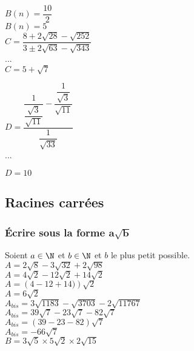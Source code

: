 $ B(n) = \dfrac{10}{2} $ \\

$ B(n) = 5 $ \\

$ C = \dfrac{8 + 2\sqrt{28} - \sqrt{252}}{3 ± 2\sqrt{63} - \sqrt{343}} $ \\

... \\

$ C = 5 + \sqrt{7} $

$ D = \dfrac{\dfrac{1}{\dfrac{\sqrt{3}}{\sqrt{11}}}-\dfrac{\dfrac{1}{\sqrt{3}}}{\sqrt{11}}}{\dfrac{1}{\sqrt{33}}} $ \\

...

$ D = 10 $

\newpage

\subsection{Racines carrées}

\subsubsection{Écrire sous la forme $ \mathbf{a\sqrt{b}} $}

Soient $ a \in \N $ et $ b \in \N $ et $ b $ le plus petit possible. \\

$ A = 2\sqrt{8} - 3\sqrt{32} + 2\sqrt{98} $ \\

$ A = 4\sqrt{2} - 12 \sqrt{2} + 14\sqrt{2} $ \\

$ A = \left(4-12+14)\right)\sqrt{2} $ \\

$ A = 6\sqrt{2} $ \\

$ A_{bis} = 3\sqrt{1183} - \sqrt{3703} - 2\sqrt{11767} $ \\

$ A_{bis} = 39\sqrt{7} - 23\sqrt{7} - 82\sqrt{7} $ \\

$ A_{bis} = \left(39-23-82\right)\sqrt{7} $ \\

$ A_{bis} = -66\sqrt{7} $ \\

$ B = 3\sqrt{5} \times 5\sqrt{2} \times 2\sqrt{15} $ \\

